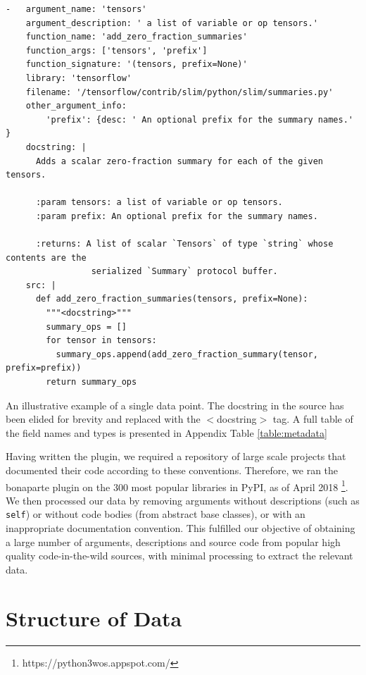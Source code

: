 \begin{listing}[ht!]
\begin{verbatim}
-   argument_name: 'tensors'                                 
    argument_description: ' a list of variable or op tensors.'  
    function_name: 'add_zero_fraction_summaries'                
    function_args: ['tensors', 'prefix']                         
    function_signature: '(tensors, prefix=None)'                    
    library: 'tensorflow'                                
    filename: '/tensorflow/contrib/slim/python/slim/summaries.py'  
    other_argument_info:             
        'prefix': {desc: ' An optional prefix for the summary names.' }
    docstring: |
      Adds a scalar zero-fraction summary for each of the given tensors.

      :param tensors: a list of variable or op tensors.
      :param prefix: An optional prefix for the summary names.

      :returns: A list of scalar `Tensors` of type `string` whose contents are the
                 serialized `Summary` protocol buffer.
    src: |
      def add_zero_fraction_summaries(tensors, prefix=None):
        """<docstring>"""
        summary_ops = []
        for tensor in tensors:
          summary_ops.append(add_zero_fraction_summary(tensor, prefix=prefix))
        return summary_ops
\end{verbatim}
     \caption{An illustrative example of a single data point. The docstring in the source has been elided for brevity and replaced with the $<$docstring$>$ tag. A full table of the field names and types is presented in Appendix Table \ref{table:metadata}}
     \label{lst:single_point_short}
\end{listing}


Having written the plugin, we required a repository of large scale projects that documented their code according to these conventions. 
Therefore, we ran the bonaparte plugin on the 300 most popular libraries in PyPI, as of April 2018 \footnote{https://python3wos.appspot.com/}.
We then processed our data by removing arguments without descriptions (such as \texttt{self}) or without code bodies (from abstract base classes), or with an inappropriate documentation convention. 
This fulfilled our objective of obtaining a large number of arguments, descriptions and source code from popular high quality code-in-the-wild sources, with minimal processing to extract the relevant data.

\section{Structure of Data}

